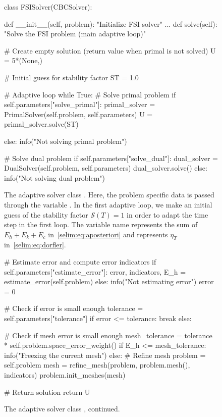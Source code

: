 \begin{figure}
  \caption{The adaptive solver class . Here, the
    problem specific data is passed through the variable . In
    the first adaptive loop, we make an initial guess of the stability
    factor $\mathcal{S}(T)=1$ in order to adapt the time step in the
    first loop.  The variable name  represents the sum of
    $E_h + E_k + E_c$ in~\eqref{selim:eq:aposteriori} and
     represents $\eta_T$ in~\eqref{selim:eq:dorfler}.}
\begin{python}
class FSISolver(CBCSolver):

    def __init__(self, problem):
        "Initialize FSI solver"
            ...
    def solve(self):
        "Solve the FSI problem (main adaptive loop)"

        # Create empty solution (return value when primal is not solved)
        U = 5*(None,)

        # Initial guess for stability factor
        ST = 1.0

        # Adaptive loop
        while True:
            # Solve primal problem
            if self.parameters["solve_primal"]:
                primal_solver = PrimalSolver(self.problem, self.parameters)
                U = primal_solver.solve(ST)

            else:
                info("Not solving primal problem")

            # Solve dual problem
            if self.parameters["solve_dual"]:
                dual_solver = DualSolver(self.problem, self.parameters)
                dual_solver.solve()
            else:
                info("Not solving dual problem")
\end{python}
\label{selim:fig:FSISolver-1}
\end{figure}

\begin{figure}
\caption{The adaptive solver class , continued.}
\begin{python}
            # Estimate error and compute error indicators
            if self.parameters["estimate_error"]:
                error, indicators, E_h = estimate_error(self.problem)
            else:
                info("Not estimating error")
                error = 0

            # Check if error is small enough
            tolerance = self.parameters["tolerance"]
            if error <= tolerance:
                break
            else:

            # Check if mesh error is small enough
            mesh_tolerance = tolerance * self.problem.space_error_weight()
            if E_h <= mesh_tolerance:
                info("Freezing the current mesh")
            else:
                # Refine mesh
                problem = self.problem
                mesh = refine_mesh(problem,
                                   problem.mesh(),
                                   indicators)
                problem.init_meshes(mesh)

        # Return solution
        return U
\end{python}
\label{selim:fig:FSISolver-2}
\end{figure}

